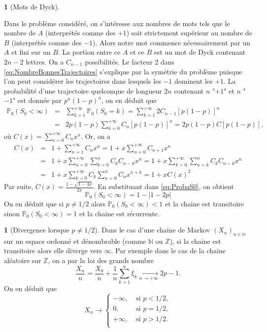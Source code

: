 \documentclass[8pt,notheorems]{beamer}
\def \N{\mathbb N}
\theoremstyle{definition}
\theoremstyle{example}
\newtheorem{example}{\translate{Exemple}}
\newtheorem{remark}{\translate{Remarque}}
\theoremstyle{mystyle}
\theoremstyle{plain}
\begin{document}
\begin{frame}[allowframebreaks]
\begin{example}[Mots de Dyck]
\end{example}
Dans le problème considéré, on s'intéresse aux nombres de mots tels que le nombre de $A$ (interprétés comme des $+1$) soit strictement supérieur au nombre de $B$ (interprétés comme des $-1$). Alors notre mot commence nécessairement par un $A$ et fini sur un $B$. La portion entre ce $A$ et ce $B$ est un mot de Dyck contenant $2n-2$ lettres. On a $C_{n-1}$ possibilités. Le facteur $2$ dans \eqref{eq:NombreBonnesTrajectoires} s'explique par la symétrie du problème puisque l'on peut considérer les trajectoires dans lesquels les $-1$ dominent les $+1$. La probabilité d'une trajectoire quelconque de longueur $2n$ contenant $n$ "$+1$" et $n$ "$-1$" est donnée par $p^{n}(1-p)^{n}$, on en déduit que
\begin{eqnarray}
\mathbb{P}_0(S_0<\infty)&=&\sum_{k=1}^{+\infty}\mathbb{P}_0(S_0=k)=\sum_{k=1}^{+\infty}2C_{n-1}[p(1-p)]^{n}\nonumber\\
&=&2p(1-p)\sum_{k=0}^{+\infty}C_{n}[p(1-p)]^{n}=2p(1-p)C[p(1-p)],\label{eq:ProbaS0}
\end{eqnarray}
où $C(x)=\sum_{n=0}^{+\infty}C_nx^{n}$. Or, on a
\begin{eqnarray*}
C(x)&=&1+\sum_{n=1}^{+\infty}C_nx^{n}=1+x\sum_{n=0}^{+\infty}C_{n+1}x^{n}\\
&=&1+x\sum_{n=0}^{+\infty}\sum_{k=0}^{n}C_kC_{n-k}x^{n}=1+x\sum_{k=0}^{+\infty}\sum_{n=k}^{n}C_kC_{n-k}x^{n}\\
&=&1+x\sum_{k=0}^{+\infty}C_k\sum_{n=0}^{n}C_{n}x^{n+k}=1+xC(x)^{2}
\end{eqnarray*}
Par suite, $C(x)=\frac{1-\sqrt{1-4x}}{2x}$. En substituant dans \eqref{eq:ProbaS0}, on obtient
$$
\mathbb{P}_0(S_0<\infty)=1-|1-2p|
$$
On en déduit que si $p\neq 1/2$ alors $\mathbb{P}_0(S_0<\infty)<1$ et la chaine est transitoire sinon $\mathbb{P}_0(S_0<\infty)=1$ et la chaine est récurrente.
\begin{remark}[Divergence lorsque $p\neq 1/2$]
Dans le cas d'une chaine de Markov $(X_n)_{n\in\N}$ sur un espace ordonné et dénombrable (comme $\N$ ou $\mathbb{Z}$), si la chaine est transitoire alors elle diverge vers $\infty$. Par exemple dans le cas de la chaine aléatoire sur $\mathbb{Z}$, on a par la loi des grands nombre
$$
\frac{X_n}{n}=\frac{X_0}{n}+\frac{1}{n}\sum_{k=1}^{n}\xi_k\underset{n\rightarrow+\infty}{\longrightarrow} 2p-1.
$$
On en déduit que
$$
X_n\rightarrow\begin{cases}
-\infty,&\text{ si }p<1/2,\\
0,&\text{ si }p=1/2,\\
+\infty,&\text{ si }p>1/2.\\
\end{cases}
$$

\end{remark}
\end{frame}
\end{document}
